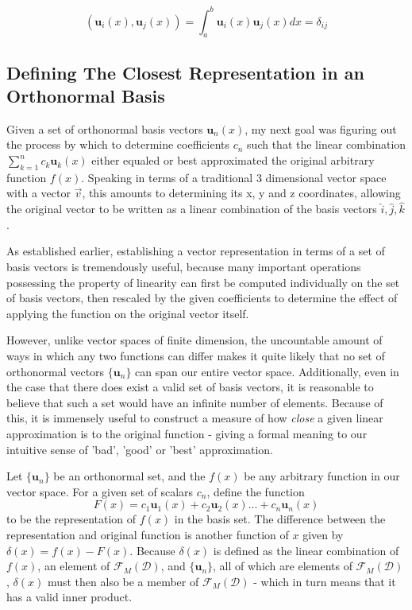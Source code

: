 \documentclass{article}
\newcommand{\B}[1]{\boldsymbol{#1}}
\newcommand*\funcSpace{\mathscr{F}_M(\mathcal{D})}
\newcommand*\basisSet{\{\B{u}_n\}}
\theoremstyle{definition}
\theoremstyle{remark}
\begin{document}
\begin{equation}
  (\B{u}_i(x), \B{u}_j(x)) = \int_a^b \B{u}_i(x) \B{u}_j(x) dx  = \delta_{ij}
\end{equation}

\subsection{Defining The Closest Representation in an Orthonormal Basis}

Given a set of orthonormal basis vectors ${\B{u}_n(x)}$, my next goal was 
figuring out the process by which to determine coefficients ${c_n}$ such 
that the linear combination $\sum_{k=1}^n c_k \B{u}_k(x)$ either equaled
or best approximated the original arbitrary function $f(x)$. Speaking
in terms of a traditional 3 dimensional vector space with a vector $\vec{v}$, this 
amounts to determining its x, y and z coordinates, allowing the original 
vector to be written as a linear combination of the basis vectors $\hat{i}, \hat{j}, \hat{k}$.

As established earlier, establishing a vector representation in terms of a set of 
basis vectors is tremendously useful, because many important operations possessing the 
property of linearity can first be computed individually on the set of basis vectors,
then rescaled by the given coefficients to determine the effect of applying the function 
on the original vector itself. 

However, unlike vector spaces of finite dimension, the uncountable amount of ways
in which any two functions can differ makes it quite likely that no set of orthonormal vectors 
$\{\B{u}_n\}$ can span our entire vector space. Additionally, even in the case that there does exist a valid set of 
basis vectors, it is reasonable to believe that such a set would have an infinite number of 
elements. Because of this, it is immensely useful to construct a measure of how 
\textit{close} a given linear approximation is to the original function - giving a formal meaning to 
our intuitive sense of 'bad', 'good' or 'best' approximation. 

Let $\{\B{u}_n\}$ be an orthonormal set, and the $f(x)$ be any arbitrary function in our vector space. 
For a given set of scalars ${c_n}$, define the function 
\begin{equation}
  F(x) = c_1 \B{u}_1(x) + c_2 \B{u}_2(x) ... + c_n \B{u}_n(x)
  \label{eq:approxFn}
\end{equation}
to be the representation of $f(x)$ in the basis set. 
The difference between the representation and original function is another function of $x$
given by $\delta(x) = f(x) - F(x)$. Because $\delta(x)$ is defined as the linear combination
of $f(x)$, an element of $\funcSpace$, and $\basisSet$, all of which are elements of $\funcSpace$,
$\delta(x)$ must then also be a member of $\funcSpace$ - which in turn means that it has a valid 
inner product. 
\end{document}
